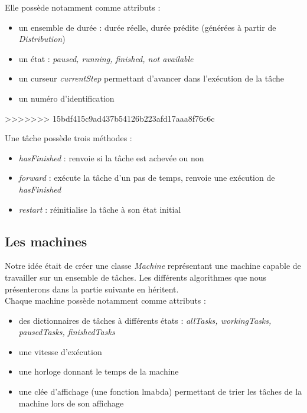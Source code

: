 \documentclass[12pt]{article}
\begin{document}
Elle possède notamment comme attributs :
\begin{itemize}
	\item un ensemble de durée : durée réelle, durée prédite (générées à partir de \emph{Distribution})
	\item un état : \emph{paused, running, finished, not available}
	\item un curseur \emph{currentStep} permettant d'avancer dans l'exécution de la tâche
	\item un numéro d'identification 
\end{itemize}
>>>>>>> 15bdf415c9ad437b54126b223afd17aaa8f76c6c

Une tâche possède trois méthodes :
\begin{itemize}
	\item \emph{hasFinished} : renvoie si la tâche est achevée ou non
	\item \emph{forward} : exécute la tâche d'un pas de temps, renvoie une exécution de \emph{hasFinished}
	\item \emph{restart} : réinitialise la tâche à son état initial
\end{itemize}

\subsection{Les machines}
Notre idée était de créer une classe \emph{Machine} représentant une machine capable de travailler sur un ensemble de tâches. Les différents algorithmes que nous présenterons dans la partie suivante en héritent. \\

Chaque machine possède notamment comme attributs :
\begin{itemize}
	\item des dictionnaires de tâches à différents états : \emph{allTasks, workingTasks, pausedTasks, finishedTasks}
	\item une vitesse d'exécution
	\item une horloge donnant le temps de la machine
	\item une clée d'affichage (une fonction lmabda) permettant de trier les tâches de la machine lors de son affichage
\end{itemize}
\end{document}
